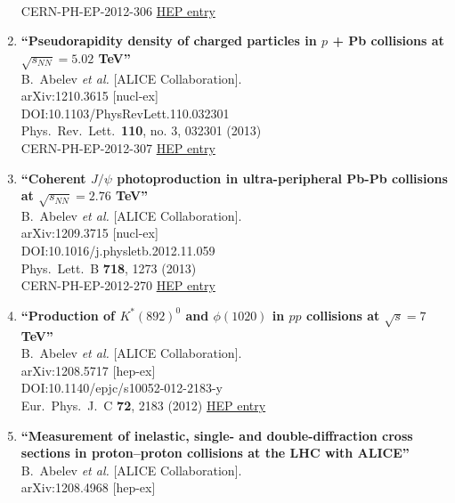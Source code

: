 \begin{enumerate}
  \\{}CERN-PH-EP-2012-306
\href{http://inspirehep.net/record/1190895}{HEP entry}
\item%
{\bf ``Pseudorapidity density of charged particles in $p$ + Pb collisions at $\sqrt{s_{NN}}=5.02$ TeV''}
  \\{}B.~Abelev {\it et al.} [ALICE Collaboration].
  \\{}arXiv:1210.3615 [nucl-ex]
  \\{}DOI:10.1103/PhysRevLett.110.032301
  \\{}Phys.\ Rev.\ Lett.\  {\bf 110}, no. 3, 032301 (2013)
  \\{}CERN-PH-EP-2012-307
\href{http://inspirehep.net/record/1190545}{HEP entry}
\item%
{\bf ``Coherent $J/\psi$ photoproduction in ultra-peripheral Pb-Pb collisions at $\sqrt{s_{NN}} = 2.76$ TeV''}
  \\{}B.~Abelev {\it et al.} [ALICE Collaboration].
  \\{}arXiv:1209.3715 [nucl-ex]
  \\{}DOI:10.1016/j.physletb.2012.11.059
  \\{}Phys.\ Lett.\ B {\bf 718}, 1273 (2013)
  \\{}CERN-PH-EP-2012-270
\href{http://inspirehep.net/record/1185785}{HEP entry}
\item%
{\bf ``Production of $K^*(892)^0$ and $\phi(1020)$ in $pp$ collisions at $\sqrt{s}=7$ TeV''}
  \\{}B.~Abelev {\it et al.} [ALICE Collaboration].
  \\{}arXiv:1208.5717 [hep-ex]
  \\{}DOI:10.1140/epjc/s10052-012-2183-y
  \\{}Eur.\ Phys.\ J.\ C {\bf 72}, 2183 (2012)
\href{http://inspirehep.net/record/1182213}{HEP entry}
\item%
{\bf ``Measurement of inelastic, single- and double-diffraction cross sections in proton--proton collisions at the LHC with ALICE''}
  \\{}B.~Abelev {\it et al.} [ALICE Collaboration].
  \\{}arXiv:1208.4968 [hep-ex]

\end{enumerate}

